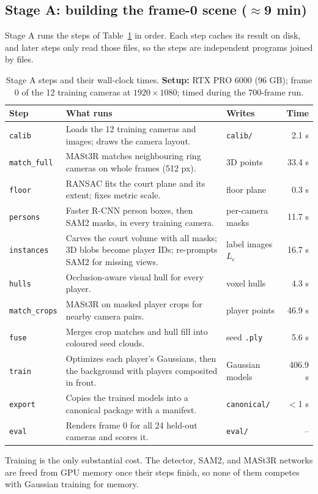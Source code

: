 \documentclass[11pt]{article}
\begin{document}
\subsection{Stage A: building the frame-0 scene ($\approx$9 min)}
Stage A runs the steps of Table~\ref{tab:stage-a} in order. Each step caches its result on disk,
and later steps only read those files, so the steps are independent programs joined by files.
\begin{table}[!htbp]\centering
\caption{Stage A steps and their wall-clock times. \textbf{Setup:} RTX PRO 6000 (96 GB); frame 0 of the 12 training cameras at $1920\times1080$; timed during the 700-frame run.}\label{tab:stage-a}
\small\begin{tabular}{p{.13\linewidth}p{.52\linewidth}p{.18\linewidth}r}\toprule
Step & What runs & Writes & Time \\\midrule
\texttt{calib} & Loads the 12 training cameras and images; draws the camera layout. & \texttt{calib/} & 2.1 s \\
\texttt{match\_full} & MASt3R matches neighbouring ring cameras on whole frames (512 px). & 3D points & 33.4 s \\
\texttt{floor} & RANSAC fits the court plane and its extent; fixes metric scale. & floor plane & 0.3 s \\
\texttt{persons} & Faster R-CNN person boxes, then SAM2 masks, in every training camera. & per-camera masks & 11.7 s \\
\texttt{instances} & Carves the court volume with all masks; 3D blobs become player IDs; re-prompts SAM2 for missing views. & label images $L_c$ & 16.7 s \\
\texttt{hulls} & Occlusion-aware visual hull for every player. & voxel hulls & 4.3 s \\
\texttt{match\_crops} & MASt3R on masked player crops for nearby camera pairs. & player points & 46.9 s \\
\texttt{fuse} & Merges crop matches and hull fill into coloured seed clouds. & seed \texttt{.ply} & 5.6 s \\
\texttt{train} & Optimizes each player's Gaussians, then the background with players composited in front. & Gaussian models & 406.9 s \\
\texttt{export} & Copies the trained models into a canonical package with a manifest. & \texttt{canonical/} & $<$1 s \\
\texttt{eval} & Renders frame 0 for all 24 held-out cameras and scores it. & \texttt{eval/} & -- \\\bottomrule
\end{tabular}\end{table}
Training is the only substantial cost. The detector, SAM2, and MASt3R networks are freed from GPU
memory once their steps finish, so none of them competes with Gaussian training for memory.
\end{document}
